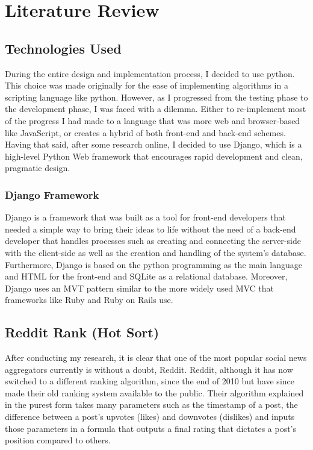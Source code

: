 
\chapter{Literature Review}

\section {Technologies Used}
During the entire design and implementation process, I decided to use python. This choice was made originally for the ease of implementing algorithms in a scripting language like python. However, as I progressed from the testing phase to the development phase, I was faced with a dilemma. Either to re-implement most of the progress I had made to a language that was more web and browser-based like JavaScript, or creates a hybrid of both front-end and back-end schemes. Having that said, after some research online, I decided to use Django, which is a high-level Python Web framework that encourages rapid development and clean, pragmatic design.

\subsection{Django Framework}
Django is a framework that was built as a tool for front-end developers that needed a simple way to bring their ideas to life without the need of a back-end developer that handles processes such as creating and connecting the server-side with the client-side as well as the creation and handling of the system's database. Furthermore, Django is based on the python programming as the main language and HTML for the front-end and SQLite as a relational database. Moreover, Django uses an MVT pattern similar to the more widely used MVC that frameworks like Ruby and Ruby on Rails use.

\section {Reddit Rank (Hot Sort)}
After conducting my research, it is clear that one of the most popular social news aggregators currently is without a doubt, Reddit. Reddit, although it has now switched to a different ranking algorithm, since the end of 2010 but have since made their old ranking system available to the public. Their algorithm explained in the purest form takes many parameters such as the timestamp of a post, the difference between a post’s upvotes (likes) and downvotes (dislikes) and inputs those parameters in a formula that outputs a final rating that dictates a post’s position compared to others.


